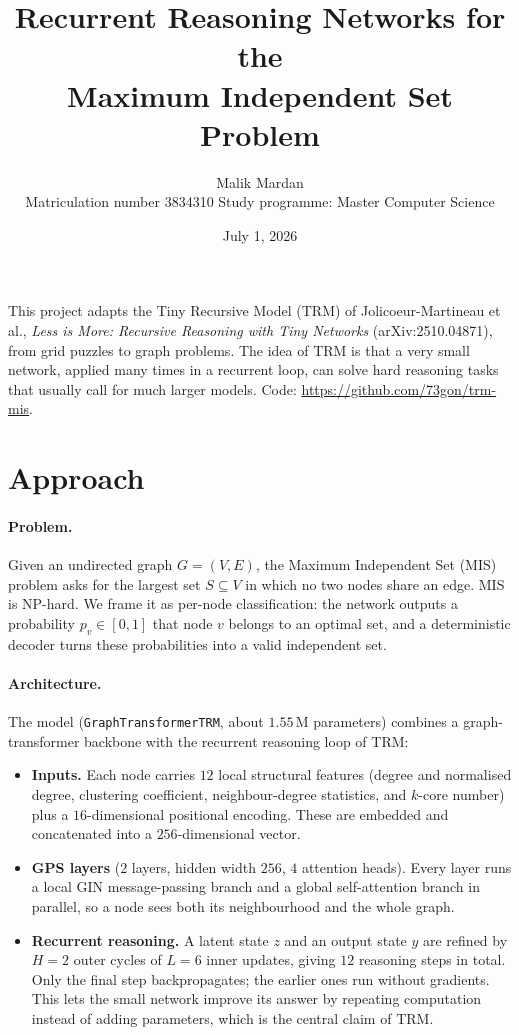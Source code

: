 \documentclass[10pt,a4paper]{article}
\title{\vspace{-1.2cm}\textbf{Recurrent Reasoning Networks for the\\Maximum Independent Set Problem}}
\author{Malik Mardan\\ \normalsize Matriculation number 3834310 \quad Study programme: Master Computer Science}
\date{July 1, 2026}
\begin{document}
\maketitle
\vspace{-0.7cm}

\noindent\small This project adapts the Tiny Recursive Model (TRM) of
Jolicoeur-Martineau et al., \emph{Less is More: Recursive Reasoning with Tiny
Networks} (arXiv:2510.04871), from grid puzzles to graph problems. The idea of
TRM is that a very small network, applied many times in a recurrent loop, can
solve hard reasoning tasks that usually call for much larger models.
Code: \url{https://github.com/73gon/trm-mis}.
\normalsize

\section{Approach}

\paragraph{Problem.}
Given an undirected graph $G=(V,E)$, the Maximum Independent Set (MIS) problem
asks for the largest set $S\subseteq V$ in which no two nodes share an edge. MIS
is NP-hard. We frame it as per-node classification: the network outputs a
probability $p_v\in[0,1]$ that node $v$ belongs to an optimal set, and a
deterministic decoder turns these probabilities into a valid independent set.

\paragraph{Architecture.}
The model (\texttt{GraphTransformerTRM}, about $1.55$\,M parameters) combines a
graph-transformer backbone with the recurrent reasoning loop of TRM:
\begin{itemize}\itemsep1pt
  \item \textbf{Inputs.} Each node carries $12$ local structural features
    (degree and normalised degree, clustering coefficient, neighbour-degree
    statistics, and $k$-core number) plus a $16$-dimensional positional encoding.
    These are embedded and concatenated into a $256$-dimensional vector.
  \item \textbf{GPS layers} ($2$ layers, hidden width $256$, $4$ attention
    heads). Every layer runs a local GIN message-passing branch and a global
    self-attention branch in parallel, so a node sees both its neighbourhood and
    the whole graph.
  \item \textbf{Recurrent reasoning.} A latent state $z$ and an output state $y$
    are refined by $H{=}2$ outer cycles of $L{=}6$ inner updates, giving $12$
    reasoning steps in total. Only the final step backpropagates; the earlier
    ones run without gradients. This lets the small network improve its answer
    by repeating computation instead of adding parameters, which is the central
    claim of TRM.
\end{itemize}
\end{document}
